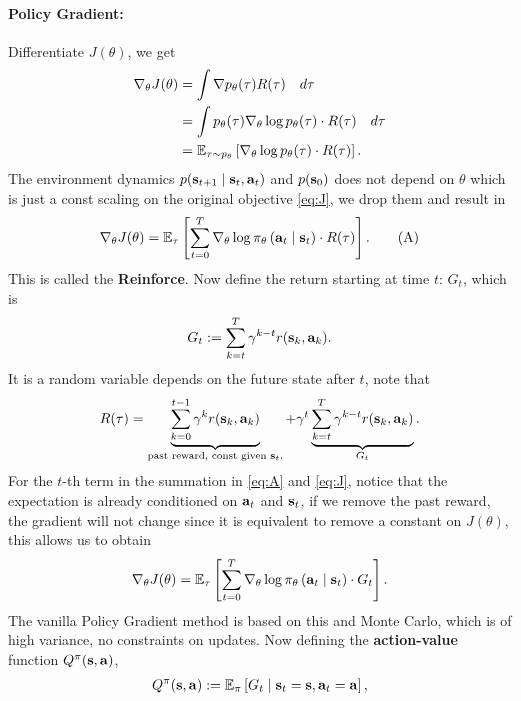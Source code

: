 \documentclass[11pt]{article}  %
\begin{document}
\paragraph{Policy Gradient:}
Differentiate $J(\theta)$, we get 
\begin{align*}
  \nabla_{\theta} J(\theta) &= \int \nabla p_\theta(\tau) R(\tau) \quad d\tau \\
  &= \int p_\theta(\tau) \nabla_{\theta} \log p_{\theta}(\tau) \cdot R(\tau) \quad d\tau \\
  &= \mathbb{E}_{\tau \sim p_\theta}\left[\nabla_\theta\log p_{\theta}(\tau)\cdot R(\tau)\right].
\end{align*}
The environment dynamics $p(\mathbf{s}_{t+1}\mid \mathbf{s}_t, \mathbf{a}_t)$ and $p(\mathbf{s}_0)$ does not depend on $\theta$ which is just a const scaling on the original objective \eqref{eq:J}, we drop them and result in
\begin{align}
  \label{eq:A}
  \nabla_{\theta} J(\theta) = \mathbb{E}_{\tau}\left[\sum_{t=0}^{T}\nabla_\theta \log \pi_{\theta}\left( \mathbf{a}_t \mid \mathbf{s}_t \right) \cdot R(\tau)\right]. \tag{A}
\end{align}
This is called the \textbf{Reinforce}.
Now define the return starting at time $t$: $G_t$, which is 
\begin{align*}
  G_t := \sum_{k=t}^{T}\gamma^{k - t}r(\mathbf{s}_k, \mathbf{a}_k).
\end{align*}
It is a random variable depends on the future state after $t$, note that 
\begin{align*}
  R(\tau) = \underbrace{\sum_{k=0}^{t-1}\gamma^k r(\mathbf{s}_k, \mathbf{a}_k)}_{\text{past reward, const given $\mathbf{s}_t$.}} + \gamma^t\underbrace{\sum_{k=t}^{T}\gamma^{k-t}r(\mathbf{s}_k, \mathbf{a}_k)}_{G_t}.
\end{align*}
For the $t$-th term in the summation in \eqref{eq:A} and \eqref{eq:J}, notice that the expectation is already conditioned on $\mathbf{a}_t$ and $\mathbf{s}_t$, if we remove the past reward, the gradient will not change since it is equivalent to remove a constant on $J(\theta)$, this allows us to obtain 
\begin{align}
  \label{eq:JG}
  \nabla_{\theta} J(\theta) = \mathbb{E}_{\tau}\left[\sum_{t=0}^{T}\nabla_\theta \log \pi_{\theta}\left( \mathbf{a}_t \mid \mathbf{s}_t \right) \cdot G_t\right].
\end{align}
The vanilla Policy Gradient method is based on this and Monte Carlo, which is of high variance, no constraints on updates.
Now defining the \textbf{action-value} function $Q^{\pi}(\mathbf{s}, \mathbf{a})$,
\begin{align*}
  Q^{\pi}(\mathbf{s}, \mathbf{a}) := \mathbb{E}_{\pi}\left[G_t \mid \mathbf{s}_t = \mathbf{s}, \mathbf{a}_t = \mathbf{a}\right],
\end{align*}
\end{document}
